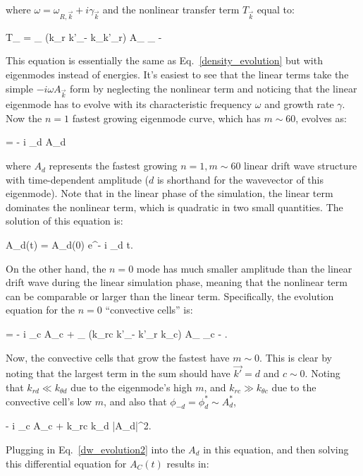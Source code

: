 where $\omega = \omega_{R,\vec{k}} + i \gamma_{\vec{k}}$ and the nonlinear transfer term $T_{\vec{k}}$ equal to:

\beq
\label{T_veck}
T_{} = \sum_{} (k_r k'_\theta - k_\theta k'_r) A_{} \phi_{ - }
\eeq

This equation is essentially the same as Eq.~\ref{density_evolution} but with eigenmodes instead of energies. It's easiest to see that the linear terms take the simple $-i \omega A_{\vec{k}}$
form by neglecting the nonlinear term and noticing
that the linear eigenmode has to evolve with its characteristic frequency $\omega$ and growth rate $\gamma$. Now the $n=1$ fastest growing eigenmode curve, which has $m \sim 60$,
evolves as:

\beq
\label{dw_evolution1}
 = - i \omega_d A_d
\eeq

where $A_d$ represents the fastest growing $n=1, m \sim 60$ linear drift wave structure with time-dependent amplitude ($d$ is shorthand for the wavevector of this eigenmode). 
Note that in the linear phase of the simulation, the linear term
dominates the nonlinear term, which is quadratic in two small quantities. The solution of this equation is:

\beq
\label{dw_evolution2}
A_d(t) = A_d(0) e^{- i \omega_d t}.
\eeq

On the other hand, the $n=0$ mode has much smaller amplitude than the linear drift wave during the linear simulation phase, meaning that the nonlinear term can be comparable or larger than
the linear term. Specifically, the evolution equation for the $n=0$ ``convective cells'' is:

\beq
\label{cc_evolution1}
 = - i \omega_c A_c + \sum_{} (k_{rc} k'_\theta - k'_r k_{\theta c}) A_{} \phi_{c - }.
\eeq

Now, the convective cells that grow the fastest have $m \sim 0$. This is clear by noting that the largest term in the sum should have $\vec{k'} = d$ and $c \sim 0$. Noting that
$k_{r d} \ll k_{\theta d}$ due to the eigenmode's high $m$, and $k_{r c} \gg k_{\theta c}$ due to the convective cell's low $m$, and also that $\phi_{-d} = \phi^*_d \sim A_d^*$,

\beq
\label{cc_evolution2}
 \approx - i \omega_c A_c + k_{rc} k_{\theta d} |A_d|^2.
\eeq

Plugging in Eq.~\ref{dw_evolution2} into the $A_d$ in this equation, and then solving this differential equation for $A_C(t)$ results in:

